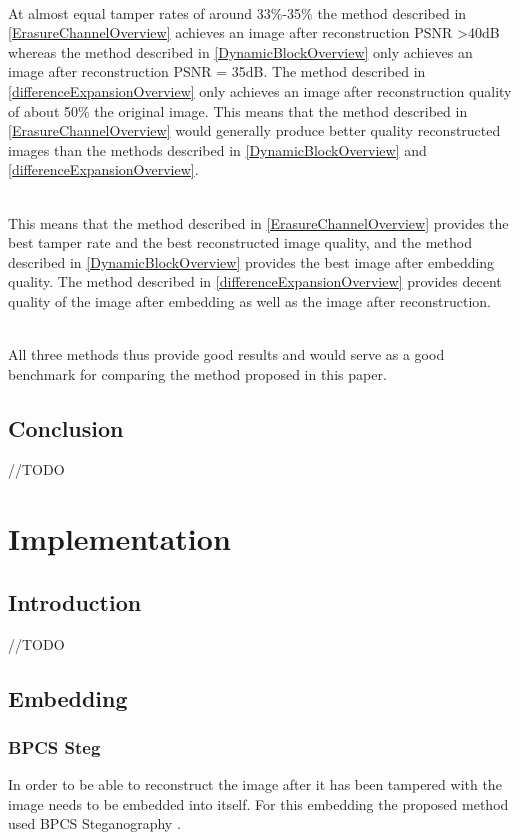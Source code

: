 \documentclass[12pt]{article}
\begin{document}
\hspace{0pt} \\
At almost equal tamper rates of around 33\%-35\% the method described in \ref{ErasureChannelOverview} achieves an image after reconstruction PSNR \textgreater 40dB whereas the method described in \ref{DynamicBlockOverview} only achieves an image after reconstruction PSNR = 35dB.
The method described in \ref{differenceExpansionOverview} only achieves an image after reconstruction quality of about 50\% the original image.
This means that the method described in \ref{ErasureChannelOverview} would generally produce better quality reconstructed images than the methods described in \ref{DynamicBlockOverview} and \ref{differenceExpansionOverview}.

\hspace{0pt} \\
This means that the method described in \ref{ErasureChannelOverview} provides the best tamper rate and the best reconstructed image quality, and the method described in \ref{DynamicBlockOverview} provides the best image after embedding quality.
The method described in \ref{differenceExpansionOverview} provides decent quality of the image after embedding as well as the image after reconstruction.

\hspace{0pt} \\
All three methods thus provide good results and would serve as a good benchmark for comparing the method proposed in this paper.

\subsection{Conclusion}
//TODO 

\section{Implementation}
\label{Implementation}
\subsection{Introduction}
//TODO

\subsection{Embedding}
\label{embedding}

\subsubsection{BPCS Steg}
\label{bpcsSteg}
In order to be able to reconstruct the image after it has been tampered with the image needs to be embedded into itself. 
For this embedding the proposed method used BPCS Steganography \cite{beaullieubpcs}.
\end{document}
